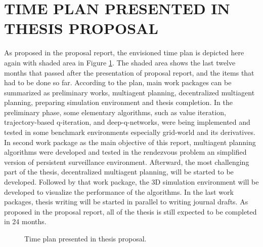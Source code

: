 \documentclass{ituphdreport}
\begin{document}
\section{TIME PLAN PRESENTED IN THESIS PROPOSAL}
As proposed in the proposal report, the envisioned time plan is depicted here again with shaded area in Figure \ref{fig:timeplan}. The shaded area shows the last twelve months that passed after the presentation of proposal report, and the items that had to be done so far. According to the plan, main work packages can be summarized as preliminary works, multiagent planning, decentralized multiagent planning, preparing simulation environment and thesis completion. In the preliminary phase, some elementary algorithms, such as value iteration, trajectory-based q-iteration, and deep-q-networks, were being implemented and tested in some benchmark environments especially grid-world and its derivatives. In second work package as the main objective of this report, multiagent planning algorithms were developed and tested in the rendezvous problem an simplified version of persistent surveillance environment. Afterward, the most challenging part of the thesis, decentralized multiagent planning, will be started to be developed. Followed by that work package, the 3D simulation environment will be developed to visualize the performance of the algorithms. In the last work packages, thesis writing will be started in parallel to writing journal drafts. As proposed in the proposal report, all of the thesis is still expected to be completed in 24 months.


\begin{figure}[h]
	\begin{center}
	\end{center}
	\caption{Time plan presented in thesis proposal.
		\label{fig:timeplan}}
\end{figure}

%
\end{document}
